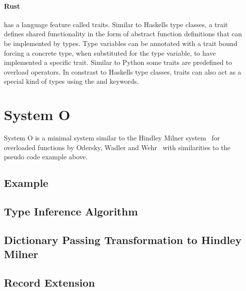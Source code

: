 \documentclass[runningheads]{llncs}
\newcommand{\snip}[1]{\footnotesize{\ttfamily{#1}}}
\begin{document}
\paragraph{Rust} has a language feature called traits. Similar to Haskells type classes, a trait defines shared functionality in the form of abstract function definitions that can be implemented by types. Type variables can be annotated with a trait bound forcing a concrete type, when substituted for the type variable, to have implemented a specific trait. Similar to Python some traits are predefined to overload operators. In constrast to Haskells type classes, traits can also act as a special kind of types using the \snip{dyn} and \snip{impl} keywords.
\section{System O}
System O is a minimal system similar to the Hindley Milner system~\cite{hindley-milner} for overloaded functions by Odersky, Wadler and Wehr~\cite{system-o} with similarities to the pseudo code example above.
\subsection{Example}
\subsection{Type Inference Algorithm}
\subsection{Dictionary Passing Transformation to Hindley Milner}
\subsection{Record Extension}
\end{document}
